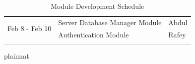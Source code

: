 \documentclass[12pt, titlepage]{article}
\begin{document}
\begin{table}[H]
\begin{tabular}{lll}
\multicolumn{1}{|l|}{\multirow{2}{*}{Feb 8 - Feb 10}}  & \multicolumn{1}{l|}{Server Database Manager Module}            & \multicolumn{1}{l|}{Abdul}                    \\ \cline{2-3} 
\multicolumn{1}{|l|}{}                                 & \multicolumn{1}{l|}{Authentication Module}                    & \multicolumn{1}{l|}{Rafey}                    \\ \hline
                                                       &                                                                &                                              
\end{tabular}
\caption{Module Development Schedule}
\label{tab:module_schedule}
\end{table}

 {plainnat}


\newpage{}
\end{document}
